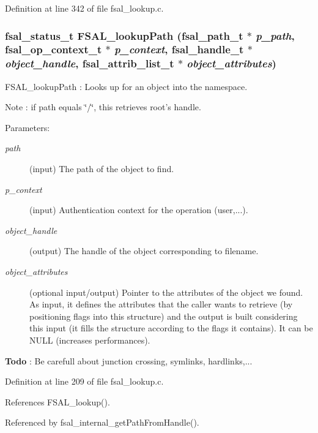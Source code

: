 Definition at line 342 of file fsal\_\-lookup.c.
\subsubsection{\setlength{\rightskip}{0pt plus 5cm}fsal\_\-status\_\-t FSAL\_\-lookup\-Path (fsal\_\-path\_\-t $\ast$ {\em p\_\-path}, fsal\_\-op\_\-context\_\-t $\ast$ {\em p\_\-context}, fsal\_\-handle\_\-t $\ast$ {\em object\_\-handle}, fsal\_\-attrib\_\-list\_\-t $\ast$ {\em object\_\-attributes})}\label{fsal__lookup_8c_a1}


FSAL\_\-lookup\-Path : Looks up for an object into the namespace.

Note : if path equals \char`\"{}/\char`\"{}, this retrieves root's handle.

\begin{Desc}
\item[Parameters:]
\begin{description}
\item[{\em path}](input) The path of the object to find. \item[{\em p\_\-context}](input) Authentication context for the operation (user,...). \item[{\em object\_\-handle}](output) The handle of the object corresponding to filename. \item[{\em object\_\-attributes}](optional input/output) Pointer to the attributes of the object we found. As input, it defines the attributes that the caller wants to retrieve (by positioning flags into this structure) and the output is built considering this input (it fills the structure according to the flags it contains). It can be NULL (increases performances).\end{description}
\end{Desc}


\begin{Desc}
\item[{\bf Todo}]: Be carefull about junction crossing, symlinks, hardlinks,...\end{Desc}


Definition at line 209 of file fsal\_\-lookup.c.

References FSAL\_\-lookup().

Referenced by fsal\_\-internal\_\-get\-Path\-From\-Handle().
